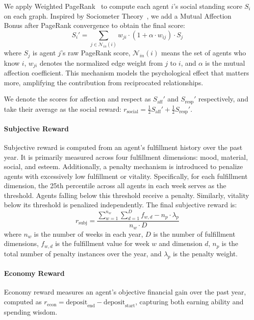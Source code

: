 We apply Weighted PageRank~\citep{page1999pagerank} to compute each agent $i$'s social standing score $S_i$ on each graph.
Inspired by Sociometer Theory~\citep{leary2012sociometer}, we add a Mutual Affection Bonus after PageRank convergence to obtain the final score:
\begin{equation}
S_i' = \sum_{j \in \mathcal{N}_{in}(i)} w_{ji} \cdot (1 + \alpha \cdot w_{ij}) \cdot S_j
\end{equation}
where $S_j$ is agent $j$'s raw PageRank score, $\mathcal{N}_{in}(i)$ means the set of agents who know $i$, $w_{ji}$ denotes the normalized edge weight from $j$ to $i$, and $\alpha$ is the mutual affection coefficient.
This mechanism models the psychological effect that  matters more, amplifying the contribution from reciprocated relationships.

We denote the scores for affection and respect as $S_{\text{aff}}'$ and $S_{\text{resp}}'$ respectively, and take their average as the social reward:
$r_{\text{social}} = \frac{1}{2}S_{\text{aff}}' + \frac{1}{2}S_{\text{resp}}'$.

\paragraph{Subjective Reward}
Subjective reward is computed from an agent's fulfillment history over the past year.
It is primarily measured across four fulfillment dimensions: mood, material, social, and esteem.
Additionally, a penalty mechanism is introduced to penalize agents with excessively low fulfillment or vitality.
Specifically, for each fulfillment dimension, the 25th percentile across all agents in each week serves as the threshold.
Agents falling below this threshold receive a penalty.
Similarly, vitality below its threshold is penalized independently.
The final subjective reward is:
\begin{equation}
r_{\text{subj}} = \frac{\sum_{w=1}^{n_w} \sum_{d=1}^{D} f_{w,d} - n_p \cdot \lambda_p}{n_w \cdot D}
\end{equation}
where $n_w$ is the number of weeks in each year, $D$ is the number of fulfillment dimensions,
$f_{w,d}$ is the fulfillment value for week $w$ and dimension $d$,
$n_p$ is the total number of penalty instances over the year,
and $\lambda_p$ is the penalty weight.

\paragraph{Economy Reward}
Economy reward measures an agent's objective financial gain over the past year,
computed as $r_{\text{econ}} = \text{deposit}_{\text{end}} - \text{deposit}_{\text{start}}$, capturing both earning ability and spending wisdom.

